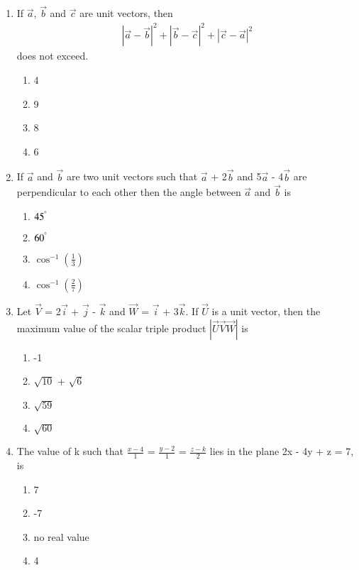 \begin{enumerate}[label=\arabic*.,ref=\thesubsection.\theenumi]
\item If $\overrightarrow{a}$, $\overrightarrow{b}$ and $\overrightarrow{c}$ are unit vectors, then 
\begin{align*}
|\overrightarrow{a} - \overrightarrow{b}|^{2} + |\overrightarrow{b} - \overrightarrow{c}|^{2} + |\overrightarrow{c} - \overrightarrow{a}|^{2}
\end{align*}
does not exceed.
\begin{enumerate}
\item 4
\item 9
\item 8
\item 6
\end{enumerate}

\item If $\overrightarrow{a}$ and $\overrightarrow{b}$ are two unit vectors such that $\overrightarrow{a}$ + 2$\overrightarrow{b}$ and 5$\overrightarrow{a}$ - 4$\overrightarrow{b}$ are perpendicular to each other then the angle between $\overrightarrow{a}$ and $\overrightarrow{b}$ is
\begin{enumerate}
\item $45^{\degree}$
\item $60^{\degree}$
\item $\cos^{-1}(\frac{1}{3})$
\item $\cos^{-1}(\frac{2}{7})$
\end{enumerate}

\item Let $\overrightarrow{V}$ = 2$\overrightarrow{i}$ + $\overrightarrow{j}$ - $\overrightarrow{k}$ and $\overrightarrow{W}$ = $\overrightarrow{i}$ + 3$\overrightarrow{k}$. If $\overrightarrow{U}$ is a unit vector, then the maximum value of the scalar triple product $|\overrightarrow{U}\overrightarrow{V}\overrightarrow{W}|$
is
\begin{enumerate}
\item -1
\item $\sqrt{10}$ + $\sqrt{6}$
\item $\sqrt{59}$
\item $\sqrt{60}$ 
\end{enumerate}

\item The value of k such that $\frac{x - 4}{1}$ = $\frac{y - 2}{1}$ = $\frac{z - k}{2}$ lies in the plane 2x - 4y + z = 7, is
\begin{enumerate}
\item 7
\item -7
\item no real value
\item 4
\end{enumerate}


\end{enumerate}
